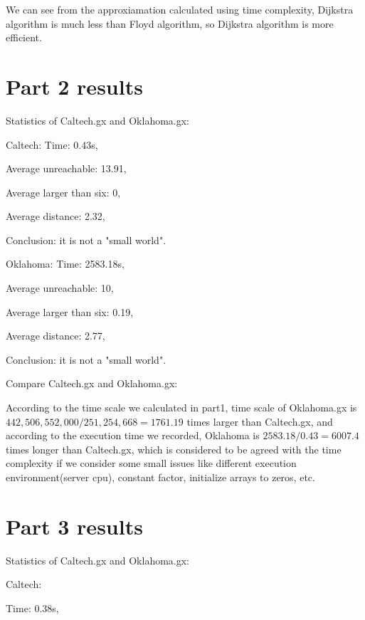 \documentclass{article}
\begin{document}
We can see from the approxiamation calculated using time complexity, Dijkstra algorithm
is much less than Floyd algorithm, so Dijkstra algorithm is more efficient.


\section{Part 2 results}
\label{sec:part2}
Statistics of Caltech.gx and Oklahoma.gx:

  Caltech: Time: 0.43s,

           Average unreachable: 13.91,

           Average larger than six: 0,

           Average distance: 2.32,

           Conclusion: it is not a "small world".

  Oklahoma: Time: 2583.18s, 

            Average unreachable: 10,

            Average larger than six: 0.19,

            Average distance: 2.77,

            Conclusion: it is not a "small world".

  Compare Caltech.gx and Oklahoma.gx:
  
  According to the time scale we calculated in part1, time scale of Oklahoma.gx is 
  $442,506,552,000 / 251,254,668 = 1761.19$ times larger than Caltech.gx, and 
  according to the execution time we recorded, Oklahoma is $2583.18 / 0.43 = 6007.4$ times longer
  than Caltech.gx, which is considered to be agreed with the time complexity if we consider some small issues like 
  different execution environment(server cpu), constant factor, initialize arrays to zeros, etc.



\section{Part 3 results}
\label{sec:part3}
Statistics of Caltech.gx and Oklahoma.gx:

  Caltech: 
           
           Time: 0.38s,
\end{document}
